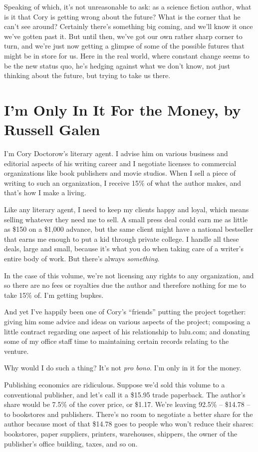 Speaking of which, it's not unreasonable to ask: as a science fiction 
author, what is it that Cory is getting wrong about the future? What is 
the corner that he can't see around? Certainly there's something big 
coming, and we'll know it once we've gotten past it. But until then, 
we've got our own rather sharp corner to turn, and we're just now 
getting a glimpse of some of the possible futures that might be in 
store for us. Here in the real world, where constant change seems to be 
the new status quo, he's hedging against what we don't know, not just 
thinking about the future, but trying to take us there.

\section{I'm Only In It For the Money, by Russell Galen}

I'm Cory Doctorow's literary agent. I advise him on various business 
and editorial aspects of his writing career and I negotiate licenses to 
commercial organizations like book publishers and movie studios. When I 
sell a piece of writing to such an organization, I receive 15\% of what 
the author makes, and that's how I make a living.

Like any literary agent, I need to keep my clients happy and loyal, 
which means selling whatever they need me to sell. A small press deal 
could earn me as little as \$150 on a \$1,000 advance, but the same 
client might have a national bestseller that earns me enough to put a 
kid through private college. I handle all these deals, large and small, 
because it's what you do when taking care of a writer's entire body of 
work. But there's always \emph{something}.

In the case of this volume, we're not licensing any rights to any 
organization, and so there are no fees or royalties due the author and 
therefore nothing for me to take 15\% of. I'm getting bupkes.

And yet I've happily been one of Cory's “friends” putting the 
project together: giving him some advice and ideas on various aspects 
of the project; composing a little contract regarding one aspect of his 
relationship to lulu.com; and donating some of my office staff time to 
maintaining certain records relating to the venture.

Why would I do such a thing? It's not \emph{pro bono}. I'm only in it 
for the money.

Publishing economics are ridiculous. Suppose we'd sold this volume to a 
conventional publisher, and let's call it a \$15.95 trade paperback. 
The author's share would be 7.5\% of the cover price, or \$1.17. We're 
leaving 92.5\% -- \$14.78 -- to bookstores and publishers. There's no 
room to negotiate a better share for the author because most of that 
\$14.78 goes to people who won't reduce their shares: bookstores, paper 
suppliers, printers, warehouses, shippers, the owner of the publisher's 
office building, taxes, and so on.

